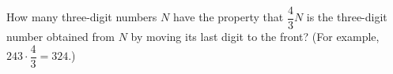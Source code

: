 How many three-digit numbers $N$ have the property that $\dfrac{4}{3}N$ is the three-digit number obtained from $N$ by moving its last digit to the front? (For example, $243\cdot\dfrac{4}{3}=324$.)
